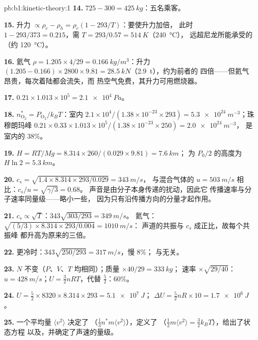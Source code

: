 \begin{solution}{pb:b1:kinetic-theory:1}
\textbf{14.} $725 - 300 = \qty{425}{kg}$：五名乘客。

\textbf{15.} 升力 $\propto \rho_c - \rho_h = \rho_c(1 - 293/T)$：要使升力加倍，
此时 $1 - 293/373 = 0.215$，需 $T = 293/0.57 = \qty{514}{K}$（\qty{240}{\degreeCelsius}），
远超尼龙所能承受的（约 \qty{120}{\degreeCelsius}）。

\textbf{16.} 氦气 $\rho = 1.205 \times 4/29 = \qty{0.166}{kg/m^3}$：升力
$(1.205 - 0.166) \times 2800 \times 9.81 = \qty{28.5}{kN}$（\qty{2.9}{t}），约为前者的
四倍——但氦气昂贵，每次着陆都会流失，而
热空气免费，其升力可用燃烧器。

\textbf{17.} $0.21 \times 1.013\times10^5 = \qty{2.1e4}{Pa}$。

\textbf{18.} $n^*_{\mathrm{O}_2} = P_{\mathrm{O}_2}/k_BT$：室内 $2.1\times10^4/
(1.38\times10^{-23} \times 293) = \qty{5.3e24}{m^{-3}}$；珠穆朗玛峰 $0.21 \times 0.33
\times 1.013\times10^5/(1.38\times10^{-23} \times 250) = \qty{2.0e24}{m^{-3}}$，
是室内的 $38\%$。

\textbf{19.} $H = RT/Mg = 8.314 \times 260/(0.029 \times 9.81) = \qty{7.6}{km}$；
为 $P_0/2$ 的高度为 $H\ln 2 = \qty{5.3}{km}$。

\textbf{20.} $c_s = \sqrt{1.4 \times 8.314 \times 293/0.029} = \qty{343}{m/s}$，
与混合气体的 $u = \qty{503}{m/s}$ 相比：$c_s/u = \sqrt{\gamma/3} = 0.68$。
声音是由分子本身传递的扰动，因此它
传播速率与分子速率同量级——略小一些，
因为只有沿传播方向的分量才起作用。

\textbf{21.} $c_s \propto \sqrt T$：$343\sqrt{303/293} = \qty{349}{m/s}$。
氦气：$\sqrt{(5/3) \times 8.314 \times 293/0.004} = \qty{1010}{m/s}$：
声道的共振与 $c_s$ 成正比，故每个共振峰
都升高为原来的三倍。

\textbf{22.} 更冷时：$343\sqrt{250/293} = \qty{317}{m/s}$，慢 $8\%$；
与无关。

\textbf{23.} $N$ 不变（$P$、$V$、$T$ 均相同）；质量 $\times 40/29 = \qty{333}{kg}$；
速率 $\times\sqrt{29/40}$：$u = \qty{428}{m/s}$；$U = \tfrac32 nRT$，代替
$\tfrac52$：$60\%$。

\textbf{24.} $U = \tfrac52 \times 8320 \times 8.314 \times 293 = \qty{5.1e7}{J}$；
$\Delta U = \tfrac52 nR \times 10 = \qty{1.7e6}{J}$。

\textbf{25.} 一个平均量 $\langle v^2\rangle$ 决定了
（$\tfrac13 n^*m\langle v^2\rangle$），定义了
（$\tfrac12 m\langle v^2\rangle = \tfrac32 k_BT$），给出了状态方程
以及，并确定了声速的量级。
\end{solution}
